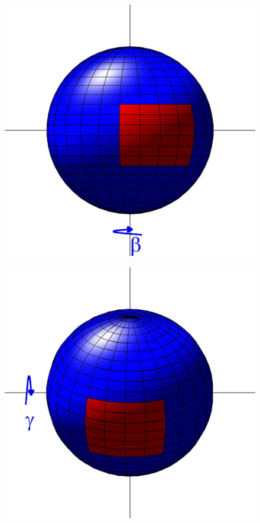 \documentclass{pnastwo}
\begin{document}
\begin{figure}
\begin{minipage}{0.22\textwidth}
\end{minipage}
\begin{minipage}{0.22\textwidth}
\centering
\includegraphics[width=\textwidth]{sphere2_3}\\
\end{minipage}
\begin{minipage}{0.22\textwidth}
\centering
\includegraphics[width=\textwidth]{sphere2_4}\\

\end{minipage}
\end{figure}
\end{document}
